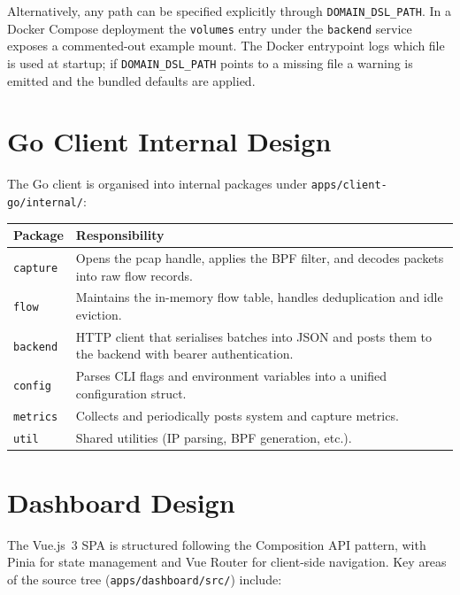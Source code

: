 \documentclass[12pt]{report}
\begin{document}
Alternatively, any path can be specified explicitly through \texttt{DOMAIN\_DSL\_PATH}.
In a Docker Compose deployment the \texttt{volumes} entry under the \texttt{backend}
service exposes a commented-out example mount.
The Docker entrypoint logs which file is used at startup; if \texttt{DOMAIN\_DSL\_PATH}
points to a missing file a warning is emitted and the bundled defaults are applied.

\section{Go Client Internal Design}

The Go client is organised into internal packages under \texttt{apps/client-go/internal/}:

\begin{center}
\begin{tabular}{lp{}}
\toprule
\textbf{Package} & \textbf{Responsibility} \\
\midrule
\texttt{capture}  & Opens the pcap handle, applies the BPF filter, and decodes packets
                    into raw flow records. \\
\texttt{flow}     & Maintains the in-memory flow table, handles deduplication and idle
                    eviction. \\
\texttt{backend}  & HTTP client that serialises batches into JSON and posts them to the
                    backend with bearer authentication. \\
\texttt{config}   & Parses CLI flags and environment variables into a unified
                    configuration struct. \\
\texttt{metrics}  & Collects and periodically posts system and capture metrics. \\
\texttt{util}     & Shared utilities (IP parsing, BPF generation, etc.). \\
\bottomrule
\end{tabular}
\end{center}

\newpage
\section{Dashboard Design}

The Vue.js~3 SPA is structured following the Composition API pattern, with Pinia for state
management and Vue Router for client-side navigation. Key areas of the source tree
(\texttt{apps/dashboard/src/}) include:
\end{document}
